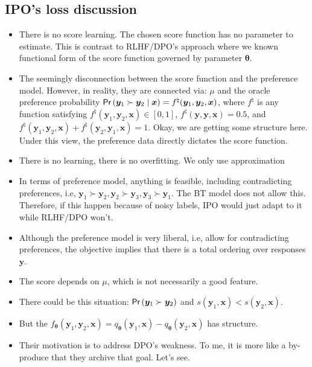 \documentclass[11pt,a4paper]{article}
\begin{document}
\subsection{IPO's loss discussion}%
\label{sub:ipo_s_loss_discussion}
\begin{itemize}
    \item There is no score learning. The chosen score function has no parameter to estimate.  This is contrast to RLHF/DPO's approach where we known functional form of the score function governed by parameter $\boldsymbol \theta$. 
    \item The seemingly disconnection between the score function and the preference model.  However, in reality, they are connected via: $\mu$ and the oracle preference probability $\textsf{Pr}\left(\bm{y}_1 \succ \bm{y}_2 \mid \bm{x}\right) = f^{\natural}(\bm{y}_1, \bm{y}_2, \bm{x})$, where $f^{\natural}$ is any function satisfying $f^{\natural}(\bm{y}_1, \bm{y}_2, \bm{x}) \in [0,1]$, $f^{\natural}(\bm{y}, \bm{y}, \bm{x})=0.5$, and $f^{\natural}(\bm{y}_1, \bm{y}_2, \bm{x})+f^{\natural}(\bm{y}_2, \bm{y}_1, \bm{x})=1$. Okay, we are getting some structure here. Under this view, the preference data directly dictates the score function.
    \item There is no learning, there is no overfitting. We only use approximation
    \item In terms of preference model, anything is feasible, including contradicting preferences, i.e, $\bm{y}_1 \succ \bm{y}_2, \bm{y}_2 \succ \bm{y}_3, \bm{y}_3 \succ \bm{y}_1$. The BT model does not allow this. Therefore, if this happen because of noisy labels, IPO would just adapt to it while RLHF/DPO won't.
    \item Although the preference model is very liberal, i.e, allow for contradicting preferences, the objective implies that there is a total ordering over responses $\bm{y}$.
    \item The score depends on $\mu$, which is not necessarily a good feature.
    \item There could be this situation: $\textsf{Pr}\left(\bm{y}_1 \succ \bm{y}_2\right)$ and $s(\bm{y}_1, \bm{x}) < s(\bm{y}_2, \bm{x})$.
    \item But the $f_{\boldsymbol \theta}(\bm{y}_1, \bm{y}_2, \bm{x})=q_{\boldsymbol \theta}(\bm{y}_1, \bm{x}) - q_{\boldsymbol \theta}(\bm{y}_2, \bm{x}) $ has structure.
    \item Their motivation is to address DPO's weakness. To me, it is more like a by-produce that they archive that goal. Let's see.
\end{itemize}
\end{document}
